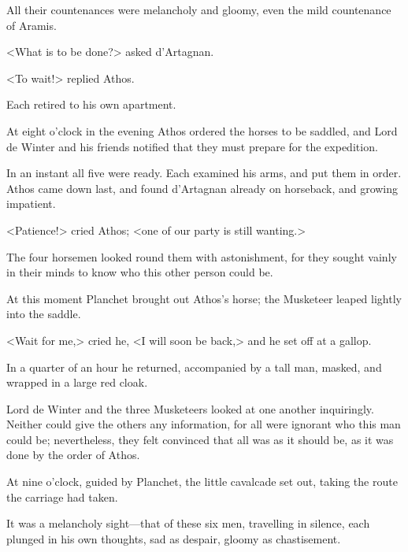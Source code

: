 All their countenances were melancholy and gloomy, even the mild countenance of Aramis. 

<What is to be done?> asked d'Artagnan. 

<To wait!> replied Athos. 

Each retired to his own apartment. 

At eight o'clock in the evening Athos ordered the horses to be saddled, and Lord de Winter and his friends notified that they must prepare for the expedition. 

In an instant all five were ready. Each examined his arms, and put them in order. Athos came down last, and found d'Artagnan already on horseback, and growing impatient. 

<Patience!> cried Athos; <one of our party is still wanting.> 

The four horsemen looked round them with astonishment, for they sought vainly in their minds to know who this other person could be. 

At this moment Planchet brought out Athos's horse; the Musketeer leaped lightly into the saddle. 

<Wait for me,> cried he, <I will soon be back,> and he set off at a gallop. 

In a quarter of an hour he returned, accompanied by a tall man, masked, and wrapped in a large red cloak. 

Lord de Winter and the three Musketeers looked at one another inquiringly. Neither could give the others any information, for all were ignorant who this man could be; nevertheless, they felt convinced that all was as it should be, as it was done by the order of Athos. 

At nine o'clock, guided by Planchet, the little cavalcade set out, taking the route the carriage had taken. 

It was a melancholy sight---that of these six men, travelling in silence, each plunged in his own thoughts, sad as despair, gloomy as chastisement.